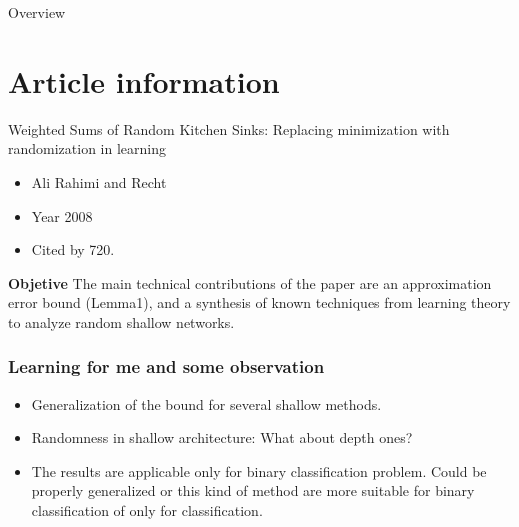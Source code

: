 


\begin{frame}{Overview}
  \tableofcontents
\end{frame}
\section{Article information}
\begin{frame}{Weighted Sums of Random Kitchen Sinks: Replacing
  minimization with randomization in learning}
  \begin{itemize}
    \item Ali Rahimi and Recht
    \item Year 2008
    \item Cited by 720. 
  \end{itemize}
  \cite{NIPS2008_0efe3284}

  \textbf{Objetive}
  The main technical contributions of the paper are an approximation error bound (Lemma1),
   and a synthesis of known techniques from learning theory to analyze random shallow networks.
\end{frame}

\begin{frame}
  \frametitle{Learning for me and some observation}

  \begin{itemize}
    \item Generalization of the bound for several shallow  methods. 
    \item Randomness in shallow architecture: What about depth ones?
    \item The results are applicable only for binary classification problem. Could be properly generalized or this kind of method are more suitable for binary classification of only for classification. 
  \end{itemize}

  

\end{frame}

